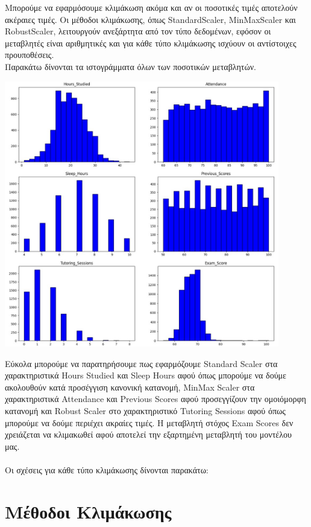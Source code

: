 \documentclass[12pt]{article}
\begin{document}
Mπορούμε να εφαρμόσουμε κλιμάκωση ακόμα και αν οι ποσοτικές τιμές αποτελούν ακέραιες τιμές. Οι μέθοδοι κλιμάκωσης, όπως StandardScaler, MinMaxScaler και RobustScaler, λειτουργούν ανεξάρτητα από τον τύπο δεδομένων, εφόσον οι μεταβλητές είναι αριθμητικές και για κάθε τύπο κλιμάκωσης ισχύουν οι αντίστοιχες προυποθέσεις.  
\\

\noindent Παρακάτω δίνονται τα ιστογράμματα όλων των ποσοτικών μεταβλητών.

\begin{center}
    \includegraphics[width=0.9\textwidth]{./images/icon2.jpg}
    
\end{center}

Εύκολα μπορούμε να παρατηρήσουμε πως εφαρμόζουμε Standard Scaler στα χαρακτηριστικά Hours Studied και Sleep Hours αφού όπως μπορούμε να δούμε ακολουθούν κατά προσέγγιση κανονική κατανομή, MinMax Scaler στα χαρακτηριστικά Attendance και Previous Scores αφού προσεγγίζουν την ομοιόμορφη κατανομή και Robust Scaler στο χαρακτηριστικό Tutoring Sessions αφού όπως μπορούμε να δούμε περιέχει ακραίες τιμές. Η μεταβλητή στόχος Exam Scores δεν χρειάζεται να κλιμακωθεί αφού αποτελεί την εξαρτημένη μεταβλητή του μοντέλου μας.\\
\\
\noindent Οι σχέσεις για κάθε τύπο κλιμάκωσης δίνονται παρακάτω: 

\section*{Μέθοδοι Κλιμάκωσης}
\end{document}
